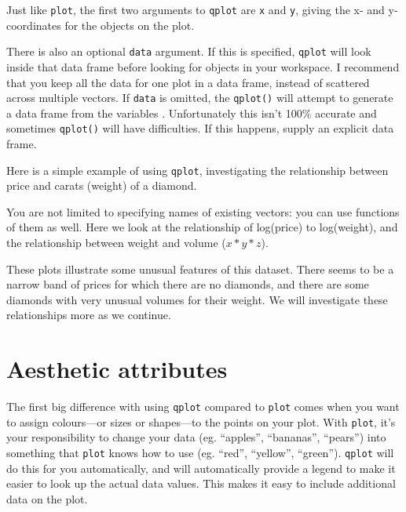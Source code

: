 Just like {\tt plot}, the first two arguments to {\tt qplot} are {\tt x} and {\tt y}, giving the x- and y-coordinates for the objects on the plot. 

There is also an optional {\tt data} argument.  If this is specified, {\tt qplot} will look inside that data frame before looking for objects in your workspace.  I recommend that you keep all the data for one plot in a data frame, instead of scattered across multiple vectors.  If {\tt data} is omitted, the {\tt qplot()} will attempt to generate a data frame from the variables .  Unfortunately this isn't 100\% accurate and sometimes {\tt qplot()} will have difficulties.  If this happens, supply an explicit data frame.

Here is a simple example of using {\tt qplot}, investigating the relationship between price and carats (weight) of a diamond.  

% 


You are not limited to specifying names of existing vectors: you can use functions of them as well.  Here we look at the relationship of log(price) to log(weight), and the relationship between weight and volume ($x * y * z$).

% 

These plots illustrate some unusual features of this dataset.  There seems to be a narrow band of prices for which there are no diamonds, and there are some diamonds with very unusual volumes for their weight.  We will investigate these relationships more as we continue.

\section{Aesthetic attributes}\label{sec:aesthetic_attributes}

The first big difference with using {\tt qplot} compared to {\tt plot} comes when you want to assign colours---or sizes or shapes---to the points on your plot.  With {\tt plot}, it's your responsibility to change your data (eg. ``apples'', ``bananas'', ``pears'') into something that {\tt plot} knows how to use (eg. ``red'', ``yellow'', ``green'').  {\tt qplot} will do this for you automatically, and will automatically provide a legend to make it easier to look up the actual data values.  This makes it easy to include additional data on the plot.  

